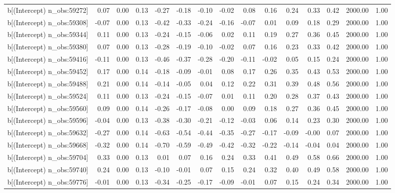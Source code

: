 \begin{table}[ht]
\begin{tabular}{rrrrrrrrrrrrrrr}
  b[(Intercept) n\_obs:59272] & 0.07 & 0.00 & 0.13 & -0.27 & -0.18 & -0.10 & -0.02 & 0.08 & 0.16 & 0.24 & 0.33 & 0.42 & 2000.00 & 1.00 \\ 
  b[(Intercept) n\_obs:59308] & -0.07 & 0.00 & 0.13 & -0.42 & -0.33 & -0.24 & -0.16 & -0.07 & 0.01 & 0.09 & 0.18 & 0.29 & 2000.00 & 1.00 \\ 
  b[(Intercept) n\_obs:59344] & 0.11 & 0.00 & 0.13 & -0.24 & -0.15 & -0.06 & 0.02 & 0.11 & 0.19 & 0.27 & 0.36 & 0.45 & 2000.00 & 1.00 \\ 
  b[(Intercept) n\_obs:59380] & 0.07 & 0.00 & 0.13 & -0.28 & -0.19 & -0.10 & -0.02 & 0.07 & 0.16 & 0.23 & 0.33 & 0.42 & 2000.00 & 1.00 \\ 
  b[(Intercept) n\_obs:59416] & -0.11 & 0.00 & 0.13 & -0.46 & -0.37 & -0.28 & -0.20 & -0.11 & -0.02 & 0.05 & 0.15 & 0.24 & 2000.00 & 1.00 \\ 
  b[(Intercept) n\_obs:59452] & 0.17 & 0.00 & 0.14 & -0.18 & -0.09 & -0.01 & 0.08 & 0.17 & 0.26 & 0.35 & 0.43 & 0.53 & 2000.00 & 1.00 \\ 
  b[(Intercept) n\_obs:59488] & 0.21 & 0.00 & 0.14 & -0.14 & -0.05 & 0.04 & 0.12 & 0.22 & 0.31 & 0.39 & 0.48 & 0.56 & 2000.00 & 1.00 \\ 
  b[(Intercept) n\_obs:59524] & 0.11 & 0.00 & 0.13 & -0.24 & -0.15 & -0.07 & 0.01 & 0.11 & 0.20 & 0.28 & 0.37 & 0.43 & 2000.00 & 1.00 \\ 
  b[(Intercept) n\_obs:59560] & 0.09 & 0.00 & 0.14 & -0.26 & -0.17 & -0.08 & 0.00 & 0.09 & 0.18 & 0.27 & 0.36 & 0.45 & 2000.00 & 1.00 \\ 
  b[(Intercept) n\_obs:59596] & -0.04 & 0.00 & 0.13 & -0.38 & -0.30 & -0.21 & -0.12 & -0.03 & 0.06 & 0.14 & 0.23 & 0.30 & 2000.00 & 1.00 \\ 
  b[(Intercept) n\_obs:59632] & -0.27 & 0.00 & 0.14 & -0.63 & -0.54 & -0.44 & -0.35 & -0.27 & -0.17 & -0.09 & -0.00 & 0.07 & 2000.00 & 1.00 \\ 
  b[(Intercept) n\_obs:59668] & -0.32 & 0.00 & 0.14 & -0.70 & -0.59 & -0.49 & -0.42 & -0.32 & -0.22 & -0.14 & -0.04 & 0.04 & 2000.00 & 1.00 \\ 
  b[(Intercept) n\_obs:59704] & 0.33 & 0.00 & 0.13 & 0.01 & 0.07 & 0.16 & 0.24 & 0.33 & 0.41 & 0.49 & 0.58 & 0.66 & 2000.00 & 1.00 \\ 
  b[(Intercept) n\_obs:59740] & 0.24 & 0.00 & 0.13 & -0.10 & -0.01 & 0.07 & 0.15 & 0.24 & 0.32 & 0.40 & 0.49 & 0.58 & 2000.00 & 1.00 \\ 
  b[(Intercept) n\_obs:59776] & -0.01 & 0.00 & 0.13 & -0.34 & -0.25 & -0.17 & -0.09 & -0.01 & 0.07 & 0.15 & 0.24 & 0.34 & 2000.00 & 1.00 \\ 

\end{tabular}
\end{table}
